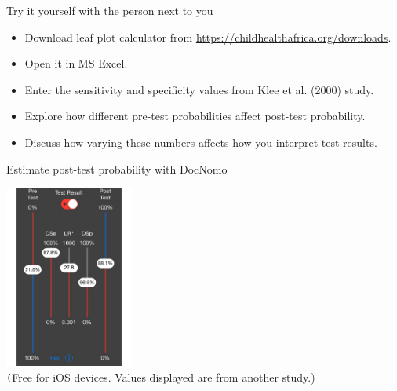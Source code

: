 \documentclass{beamer}
\begin{document}
% 
\begin{frame}{Try it yourself with the person next to you}
\begin{itemize}
	\item Download leaf plot calculator from \url{https://childhealthafrica.org/downloads}. 
	\item Open it in MS Excel.
	\item Enter the sensitivity and specificity values from Klee et al. (2000) study.
	\item Explore how different pre-test probabilities affect post-test probability.
	\item Discuss how varying these numbers affects how you interpret test results.  
\end{itemize}
\end{frame}

% 
\begin{frame}{Estimate post-test probability with DocNomo}
	\begin{center}
		\includegraphics[height=6cm]{images/nomogram-app.pdf} \\
		\vspace{0.5cm}
		\texttt (Free for iOS devices. Values displayed are from another study.)
	\end{center}
\end{frame}


% 
\end{document}
